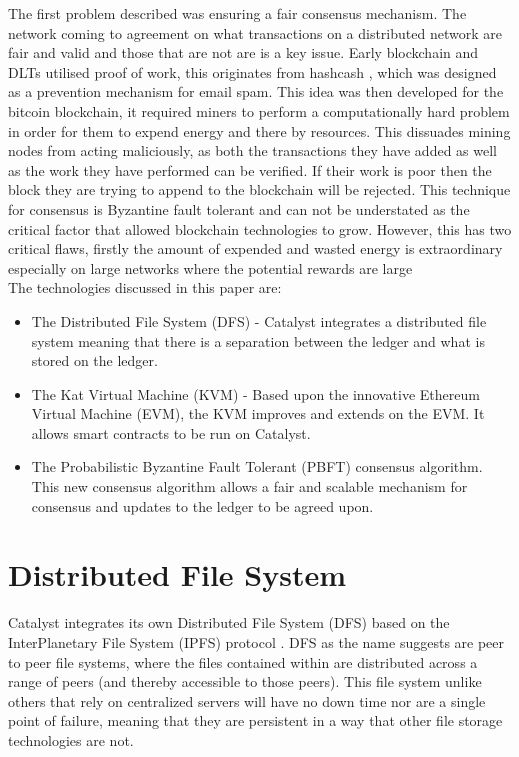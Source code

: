 \documentclass{article}
\begin{document}
The first problem described was ensuring a fair consensus mechanism. The network coming to agreement on what transactions on a distributed network are fair and valid and those that are not are is a key issue. Early blockchain and DLTs utilised proof of work, this originates from hashcash \cite{back2002hashcash}, which was designed as a prevention mechanism for email spam. This idea was then developed for the bitcoin blockchain, it required miners to perform a computationally hard problem in order for them to expend energy and there by resources. This dissuades mining nodes from acting maliciously, as both the transactions they have added as well as the work they have performed can be verified. If their work is poor then the block they are trying to append to the blockchain will be rejected. This technique for consensus is Byzantine fault tolerant and can not be understated as the critical factor that allowed blockchain technologies to grow. However, this has two critical flaws, firstly the amount of expended and wasted energy is extraordinary especially on large networks where the potential rewards are large \\




The technologies discussed in this paper are:

\begin{itemize}
\item The Distributed File System (DFS) - Catalyst integrates a distributed file system meaning that there is a separation between the ledger and what is stored on the ledger.
\item The Kat Virtual Machine (KVM) - Based upon the innovative Ethereum Virtual Machine (EVM), the KVM improves and extends on the EVM. It allows smart contracts to be run on Catalyst.
\item The Probabilistic Byzantine Fault Tolerant (PBFT) consensus algorithm. This new consensus algorithm allows a fair and scalable mechanism for consensus and updates to the ledger to be agreed upon.
\end{itemize}



\section{Distributed File System}

Catalyst integrates its own Distributed File System (DFS) \cite{DFS} based on the InterPlanetary File System (IPFS) protocol \cite{benet2014ipfs}. DFS as the name suggests are peer to peer file systems, where the files contained within are distributed across a range of peers (and thereby accessible to those peers). This file system unlike others that rely on centralized servers will have no down time nor are a single point of failure, meaning that they are persistent in a way that other file storage technologies are not. \\
\end{document}
